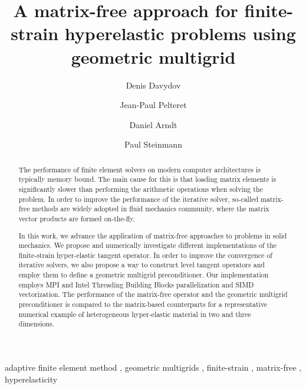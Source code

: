 \documentclass[preprint,12pt,times]{elsarticle}
\begin{document}
\begin{frontmatter}
  \title{
  A matrix-free approach for finite-strain hyperelastic problems using geometric multigrid
  }

  \author[a]{Denis Davydov}

  \author[a]{Jean-Paul Pelteret}

  \author[b]{Daniel Arndt}

  \author[a]{Paul Steinmann}


  \address[a]{Chair of Applied Mechanics,
  Friedrich-Alexander-Universit\"{a}t Erlangen-N\"{u}rnberg,
  Egerlandstr.\ 5, 91058 Erlangen, Germany}

  \address[b]{Interdisciplinary Center for Scientific Computing (IWR),
      Heidelberg University,
      Im Neuenheimer Feld 205,
      69120 Heidelberg,
      Germany}


  \begin{abstract}
    The performance of finite element solvers on modern computer architectures is typically memory bound.
    The main cause for this is that loading matrix elements is significantly slower than performing the arithmetic operations when solving the problem.
    In order to improve the performance of the iterative solver, so-called matrix-free methods are
    widely adopted in fluid mechanics community, where the matrix vector products are formed on-the-fly.

    In this work, we advance the application of matrix-free approaches to problems in solid mechanics.
    We propose and numerically investigate different implementations of the finite-strain hyper-elastic tangent operator.
    In order to improve the convergence of iterative solvers, we also propose a way to construct level tangent operators
    and employ them to define a geometric multigrid preconditioner.
    Our implementation employs MPI and Intel Threading Building Blocks parallelization and SIMD vectorization.
    The performance of the matrix-free operator and the geometric multigrid preconditioner is compared to the matrix-based counterparts for a representative numerical example of heterogeneous hyper-elastic material in two and three dimensions.
  \end{abstract}


  \begin{keyword}
      adaptive finite element method \sep
      geometric multigrids \sep
      finite-strain \sep
      matrix-free \sep
      hyperelasticity
  \end{keyword}

  \end{frontmatter}
\end{document}
